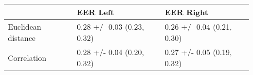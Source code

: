 \begin{tabular}{lll}
\toprule
{} &                    EER Left &                   EER Right \\
\midrule
Euclidean distance &  0.28 +/- 0.03 (0.23, 0.32) &  0.26 +/- 0.04 (0.21, 0.30) \\
Correlation        &  0.28 +/- 0.04 (0.20, 0.32) &  0.27 +/- 0.05 (0.19, 0.32) \\
\bottomrule
\end{tabular}

